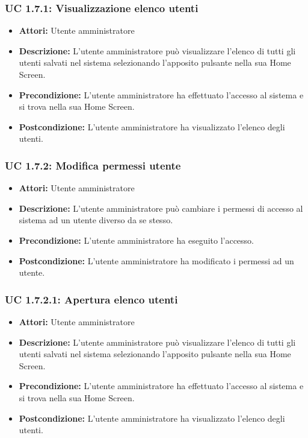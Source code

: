 \subsubsection{UC 1.7.1: Visualizzazione elenco utenti}

\begin{itemize}
    \item \textbf{Attori:} Utente amministratore
    \item \textbf{Descrizione:} L'utente amministratore può visualizzare l'elenco di tutti gli utenti salvati nel sistema selezionando l'apposito pulsante nella sua Home Screen.
    \item \textbf{Precondizione:} L'utente amministratore ha effettuato l'accesso al sistema e si trova nella sua Home Screen.
    \item \textbf{Postcondizione:} L'utente amministratore ha visualizzato l'elenco degli utenti.
\end{itemize}

\subsubsection{UC 1.7.2: Modifica permessi utente}

\begin{itemize}
    \item \textbf{Attori:} Utente amministratore
    \item \textbf{Descrizione:} L'utente amministratore può cambiare i permessi di accesso al sistema ad un utente diverso da se stesso.
    \item \textbf{Precondizione:} L'utente amministratore ha eseguito l'accesso.
    \item \textbf{Postcondizione:} L'utente amministratore ha modificato i permessi ad un utente.
\end{itemize}

\subsubsection{UC 1.7.2.1: Apertura elenco utenti}

\begin{itemize}
    \item \textbf{Attori:} Utente amministratore
    \item \textbf{Descrizione:} L'utente amministratore può visualizzare l'elenco di tutti gli utenti salvati nel sistema selezionando l'apposito pulsante nella sua Home Screen.
    \item \textbf{Precondizione:} L'utente amministratore ha effettuato l'accesso al sistema e si trova nella sua Home Screen.
    \item \textbf{Postcondizione:} L'utente amministratore ha visualizzato l'elenco degli utenti.
\end{itemize}

